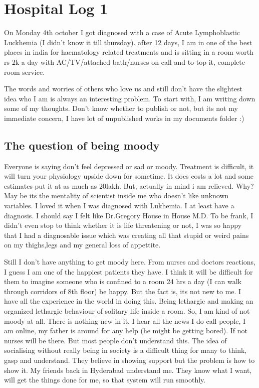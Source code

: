 \section*{Hospital Log 1}
\vskip 2pt

On Monday 4th october I got diagnosed with a case of Acute Lymphoblastic Luckhemia 
(I didn't know it till thursday). after 12 days, I am in one of the best places in
 india for haematology related treatments and is sitting in a room worth rs 2k a day
 with AC/TV/attached bath/nurses on call and to top it, complete room service.

The words and worries of others who love us and still don't have the slightest idea
 who I am is always an interesting problem. To start with, I am writing down some of
 my thoughts. Don't know whether to publish or not, but its not my immediate concern,
 I have lot of unpublished works in my documents folder :)

\subsection*{The question of being moody} 

Everyone is saying don't feel depressed or sad or moody. Treatment is difficult, it 
will turn your physiology upside down for sometime. It does costs a lot and some 
estimates put it at as much as 20lakh. But, actually in mind i am relieved. Why? May 
be its the mentality of scientist inside me who doesn't like unknown variables. I loved
 it when I was diagnosed with Lukhemia. I at least have a diagnosis. I should say I 
felt like Dr.Gregory House in House M.D. To be frank, I didn't even stop to think whether
 it is life threatening or not, I was so happy that I had a diagnosable issue which was 
creating all that stupid or weird pains on my thighs,legs and my general loss of appettite.

Still I don't have anything to get moody here. From nurses and doctors reactions, I guess
I am one of the happiest patients they have. I think it will be difficult for them to 
imagine someone who is confined to a room 24 hrs a day (I can walk through corridors of
 8th floor) be happy. But the fact is, its not new to me. I have all the experience in 
the world in doing this. Being lethargic and making an organized lethargic behaviour of
solitary life inside a room. So, I am kind of not moody at all. There is nothing new in it,
I hear all the news I do call people, I am online, my father is around for any help (he might
be getting bored). If not nurses will be there. But most people don't understand this. The
idea of socialising without really being in society is a difficult thing for many to think, 
gasp and understand. They believe in showing support but the problem is how to show it. My 
friends back in Hyderabad understand me. They know what I want, will get the things done for
me, so that system will run smoothly. 


